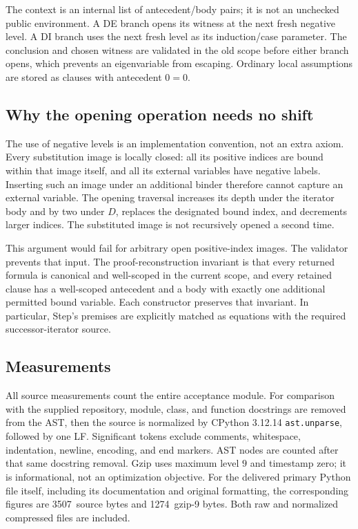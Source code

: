 \documentclass[11pt,letterpaper]{article}
\theoremstyle{definition}
\newcommand{\StepSourceBytes}{3507}
\newcommand{\StepSourceGzip}{1274}
\begin{document}
The context is an internal list of antecedent/body pairs; it is not
an unchecked public environment. A DE branch opens its witness at
the next fresh negative level. A DI branch uses the next fresh level
as its induction/case parameter. The conclusion and chosen witness are
validated in the old scope before either branch opens, which prevents
an eigenvariable from escaping. Ordinary local assumptions are stored
as clauses with antecedent \(0=0\).

\subsection{Why the opening operation needs no shift}

The use of negative levels is an implementation convention, not an
extra axiom. Every substitution image is locally closed: all its
positive indices are bound within that image itself, and all its
external variables have negative labels. Inserting such an image
under an additional binder therefore cannot capture an external
variable. The opening traversal increases its depth under the
iterator body and by two under \(D\), replaces the designated bound
index, and decrements larger indices. The substituted image is not
recursively opened a second time.

This argument would fail for arbitrary open positive-index images.
The validator prevents that input. The proof-reconstruction invariant is
that every returned formula is canonical and well-scoped in the current
scope, and every retained clause has a well-scoped antecedent and a
body with exactly one additional permitted bound variable. Each
constructor preserves that invariant. In particular, Step's
premises are explicitly matched as equations with the required
successor-iterator source.

\subsection{Measurements}

All source measurements count the entire acceptance module.
For comparison with the supplied repository, module, class, and
function docstrings are removed from the AST, then the source is
normalized by CPython 3.12.14 \texttt{ast.unparse}, followed by one LF.
Significant tokens exclude comments, whitespace, indentation, newline,
encoding, and end markers. AST nodes are counted after that same
docstring removal. Gzip uses maximum level \(9\) and timestamp zero;
it is informational, not an optimization objective.
For the delivered primary Python file itself, including its documentation
and original formatting, the corresponding figures are
\StepSourceBytes\ source bytes and \StepSourceGzip\ gzip-9 bytes.
Both raw and normalized compressed files are included.
\end{document}
